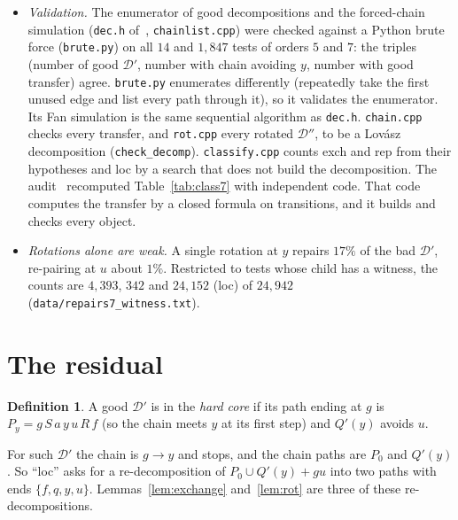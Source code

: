 \documentclass[11pt]{amsart}
\theoremstyle{definition}
\newtheorem{definition}[theorem]{Definition}
\newcommand{\cD}{\mathcal D}
\begin{document}
\begin{itemize}
\item \emph{Validation.} The enumerator of good decompositions and the forced-chain simulation
(\texttt{dec.h} of~\cite{L1I}, \texttt{chainlist.cpp}) were checked against a Python brute force
(\texttt{brute.py}) on all $14$ and $1{,}847$ tests of orders $5$ and $7$: the triples (number of
good $\cD'$, number with chain avoiding $y$, number with good transfer) agree. \texttt{brute.py}
enumerates differently (repeatedly take the first unused edge and list every path through it), so it
validates the enumerator. Its Fan simulation is the same sequential algorithm as \texttt{dec.h}.
\texttt{chain.cpp} checks every transfer, and \texttt{rot.cpp} every rotated $\cD''$, to be a
Lov\'asz decomposition (\texttt{check\_decomp}). \texttt{classify.cpp} counts exch and rep from
their hypotheses and loc by a search that does not build the decomposition. The audit~\cite{A34}
recomputed Table~\ref{tab:class7} with independent code. That code computes the transfer by a closed
formula on transitions, and it builds and checks every object.
\item \emph{Rotations alone are weak.} A single rotation at $y$ repairs $17\%$ of the bad
$\cD'$, re-pairing at $u$ about $1\%$. Restricted to tests whose child has a witness, the counts are
$4{,}393$, $342$ and $24{,}152$ (loc) of $24{,}942$ (\texttt{data/repairs7\_witness.txt}).
\end{itemize}

\section{The residual}\label{sec:residual}

\begin{definition}\label{def:hard}
A good $\cD'$ is in the \emph{hard core} if its path ending at $g$ is $P_y=g\,S\,a\,y\,u\,R\,f$
(so the chain meets $y$ at its first step) and $Q'(y)$ avoids $u$.
\end{definition}

For such $\cD'$ the chain is $g\to y$ and stops, and the chain paths are $P_0$ and $Q'(y)$. So
``loc'' asks for a re-decomposition of $P_0\cup Q'(y)+gu$ into two paths with ends
$\{f,q,y,u\}$. Lemmas~\ref{lem:exchange} and~\ref{lem:rot} are three of these
re-decompositions.
\end{document}
